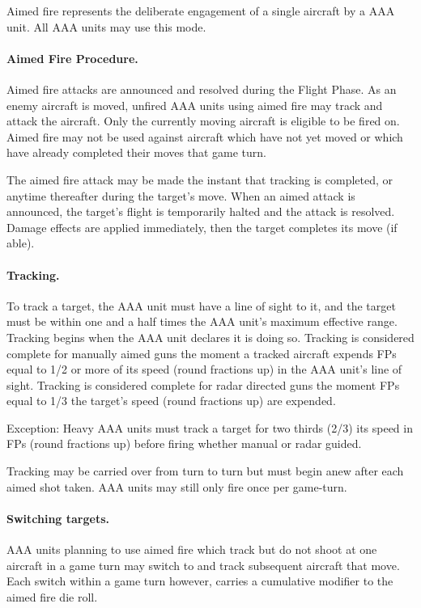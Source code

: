 Aimed fire represents the deliberate engagement of a single aircraft by a AAA unit. All AAA units may use this mode.

\paragraph{Aimed Fire Procedure.} Aimed fire attacks are announced and resolved during the Flight Phase. As an enemy aircraft is moved, unfired AAA units using aimed fire may track and attack the aircraft. Only the currently moving aircraft is eligible to be fired on. Aimed fire may not be used against aircraft which have not yet moved or which have already completed their moves that game turn.

The aimed fire attack may be made the instant that tracking is completed, or anytime thereafter during the target's move. When an aimed attack is announced, the target's flight is temporarily halted and the attack is resolved. Damage effects are applied immediately, then the target completes its move (if able).

\paragraph{Tracking.} To track a target, the AAA unit must have a line of sight to it, and the target must be within one and a half times the AAA unit's maximum effective range. Tracking begins when the AAA unit declares it is doing so. Tracking is considered complete for manually aimed guns the moment a tracked aircraft expends FPs equal to 1/2 or more of its speed (round fractions up) in the AAA unit's line of sight. Tracking is considered complete for radar directed guns the moment FPs equal to 1/3 the target's speed (round fractions up) are expended.

Exception: Heavy AAA units must track a target for two thirds (2/3) its speed in FPs (round fractions up) before firing whether manual or radar guided.

Tracking may be carried over from turn to turn but must begin anew after each aimed shot taken. AAA units may still only fire once per game-turn.

\paragraph{Switching targets.} AAA units planning to use aimed fire which track but do not shoot at one aircraft in a game turn may switch to and track subsequent aircraft that move. Each switch within a game turn however, carries a cumulative  modifier to the aimed fire die roll.

